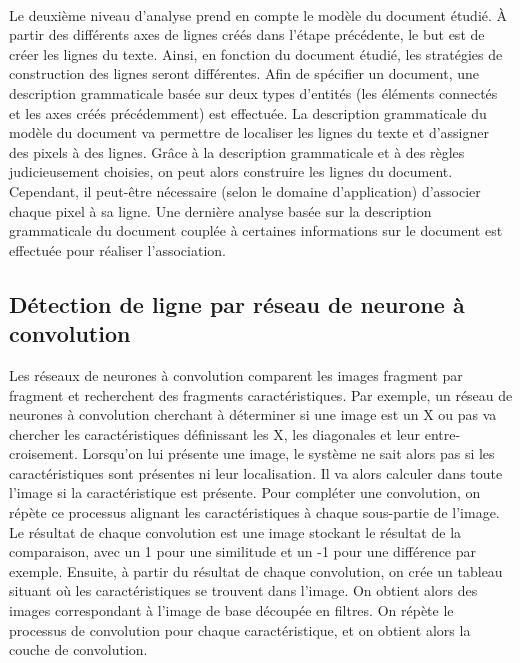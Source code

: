 \paragraph{}
Le deuxième niveau d'analyse prend en compte le modèle du document étudié. À partir des différents axes de lignes créés dans l'étape
précédente, le but est de créer les lignes du texte. Ainsi, en fonction du document étudié, les stratégies de construction des lignes
seront différentes. Afin de spécifier un document, une description grammaticale basée sur deux types d'entités (les éléments connectés
et les axes créés précédemment) est effectuée. La description grammaticale du modèle du document va permettre de localiser les lignes
du texte et d'assigner des pixels à des lignes. Grâce à la description grammaticale et à des règles judicieusement choisies, on peut alors
construire les lignes du document. Cependant, il peut-être nécessaire (selon le domaine d'application) d'associer chaque pixel à sa ligne.
Une dernière analyse basée sur la description grammaticale du document couplée à certaines informations sur le document
est effectuée pour réaliser l'association.

\subsection{Détection de ligne par réseau de neurone à convolution}

Les réseaux de neurones à convolution comparent les images fragment par fragment et recherchent des fragments caractéristiques.
Par exemple, un réseau de neurones à convolution cherchant à déterminer si une image est un X ou pas va chercher les caractéristiques
définissant les X, les diagonales et leur entre-croisement. Lorsqu'on lui présente une image, le système ne sait alors pas si les
caractéristiques sont présentes ni leur localisation. Il va alors calculer dans toute l'image si la caractéristique est présente.
Pour compléter une convolution, on répète ce processus alignant les caractéristiques à chaque sous-partie de l'image.
Le résultat de chaque convolution est une image stockant le résultat de la comparaison, avec un 1 pour une similitude et un -1
pour une différence par exemple. Ensuite, à partir du résultat de chaque convolution, on crée un tableau situant où les
caractéristiques se trouvent dans l'image. On obtient alors des images correspondant à l'image de base découpée en filtres.
On répète le processus de convolution pour chaque caractéristique, et on obtient alors la couche de convolution.


